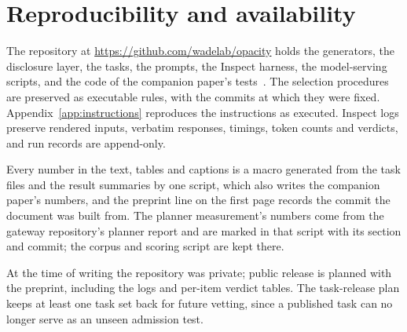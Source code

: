 \section{Reproducibility and availability}
\label{sec:reproducibility}

The repository at \url{https://github.com/wadelab/opacity} holds the generators, the disclosure layer, the tasks, the prompts, the Inspect harness, the model-serving scripts, and the code of the companion paper's tests~\cite{wade2026vetting}. The selection procedures are preserved as executable rules, with the commits at which they were fixed. Appendix~\ref{app:instructions} reproduces the instructions as executed. Inspect logs preserve rendered inputs, verbatim responses, timings, token counts and verdicts, and run records are append-only.

Every number in the text, tables and captions is a macro generated from the task files and the result summaries by one script, which also writes the companion paper's numbers, and the preprint line on the first page records the commit the document was built from. The planner measurement's numbers come from the gateway repository's planner report and are marked in that script with its section and commit; the corpus and scoring script are kept there.

At the time of writing the repository was private; public release is planned with the preprint, including the logs and per-item verdict tables. The task-release plan keeps at least one task set back for future vetting, since a published task can no longer serve as an unseen admission test.

